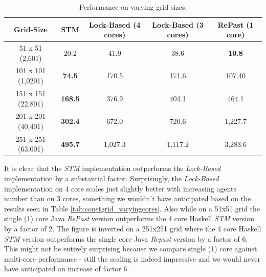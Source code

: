 \begin{table}
	\centering
  	\begin{tabular}{ c || c | c | c | c }
        Grid-Size          & STM              & Lock-Based (4 cores) & Lock-Based (3 cores) & RePast (1 core) \\ \hline \hline 
   		51 x 51 (2,601)    & 20.2             & 41.9                 & 38.6                 & \textbf{10.8}   \\ \hline
   		101 x 101 (1,0201) & \textbf{74.5}    & 170.5                & 171.6                & 107.40          \\ \hline
   		151 x 151 (22,801) & \textbf{168.5}   & 376.9                & 404.1                & 464.1           \\ \hline
   		201 x 201 (40,401) & \textbf{302.4}   & 672.0                & 720.6                & 1,227.7         \\ \hline
   		251 x 251 (63,001) & \textbf{495.7}   & 1,027.3              & 1,117.2              & 3,283.6         \\ \hline \hline
  	\end{tabular}

  	\caption{Performance on varying grid sizes.}
	\label{tab:varyinggrid_constcores}
\end{table}

It is clear that the \textit{STM} implementation outperforms the \textit{Lock-Based} implementation by a substantial factor. Surprisingly, the \textit{Lock-Based} implementation on 4 core scales just slightly better with increasing agents number than on 3 cores, something we wouldn't have anticipated based on the results seen in Table \ref{tab:constgrid_varyingcores}. Also  while on a 51x51 grid the single (1) core Java \textit{RePast} version outperforms the 4 core Haskell \textit{STM} version by a factor of 2. The figure is inverted on a 251x251 grid where the 4 core Haskell \textit{STM} version outperforms the single core Java \textit{Repast} version by a factor of 6. This might not be entirely surprising because we compare single (1) core against multi-core performance - still the scaling is indeed impressive and we would never have anticipated an increase of factor 6. %

